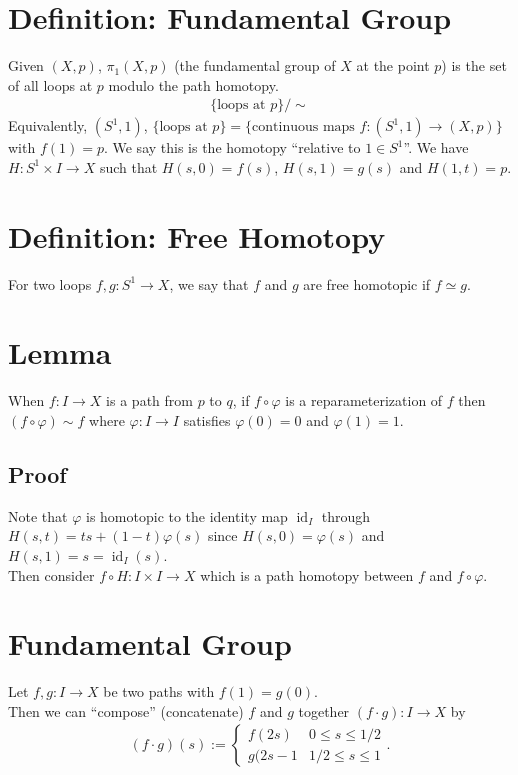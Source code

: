\documentclass[11pt]{article}
\begin{document}
\section*{Definition: Fundamental Group}
\label{sec:org6da0872}
Given \((X,p)\), \(\pi_{1}(X,p)\) (the fundamental group of \(X\) at the point \(p\)) is the set of all loops at \(p\) modulo the path homotopy.\\
\begin{align*}
  \{\text{loops at }p\}/\sim
\end{align*}
Equivalently, \((S^{1},1)\), \(\{\text{loops at }p\}=\{\text{continuous maps }f:(S^{1},1)\to(X,p)\}\) with \(f(1)=p\). We say this is the homotopy ``relative to \(1\in S^{1}\)''. We have \(H:S^{1}\times I\to X\) such that \(H(s,0)=f(s)\), \(H(s,1)=g(s)\) and \(H(1,t)=p\).\\
\section*{Definition: Free Homotopy}
\label{sec:org7b80a82}
For two loops \(f,g: S^{1}\to X\), we say that \(f\) and \(g\) are free homotopic if \(f\simeq g\).\\
\section*{Lemma}
\label{sec:org77f2f50}
When \(f:I\to X\) is a path from \(p\) to \(q\), if \(f\circ\varphi\) is a reparameterization of \(f\) then \((f\circ\varphi)\sim f\) where \(\varphi:I\to I\) satisfies \(\varphi(0)=0\) and \(\varphi(1)=1\).\\
\subsection*{Proof}
\label{sec:org349ab46}
Note that \(\varphi\) is homotopic to the identity map \(\operatorname{id}_{I}\) through \(H(s,t)=ts+(1-t)\varphi(s)\) since \(H(s,0)=\varphi(s)\) and \(H(s,1)=s=\operatorname{id}_{I}(s)\).\\
Then consider \(f\circ H:I\times I\to X\) which is a path homotopy between \(f\) and \(f\circ\varphi\).\\
\section*{Fundamental Group}
\label{sec:orga0001a6}
Let \(f,g:I\to X\) be two paths with \(f(1)=g(0)\).\\
Then we can ``compose'' (concatenate) \(f\) and \(g\) together \((f\cdot g):I\to X\) by\\
\begin{align*}
  (f\cdot g)(s):=\begin{cases}
    f(2s) & 0\leq s\leq 1/2 \\
    g(2s-1 & 1/2\leq s\leq 1
  \end{cases}.
\end{align*}
\end{document}
